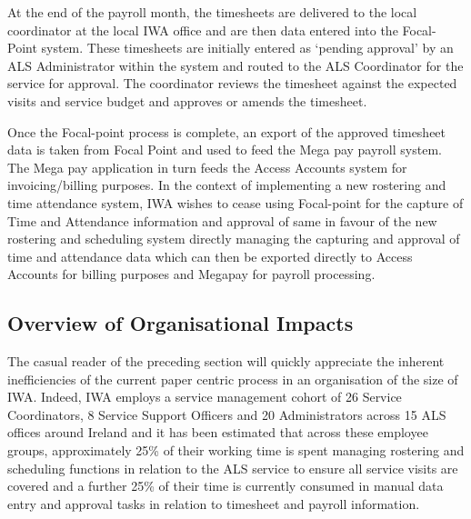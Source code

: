 \documentclass[a4paper,12pt]{article}
\begin{document}
\begin{samepage}
At the end of the payroll month, the timesheets are delivered to the local coordinator at the local IWA office and are then data entered into the Focal-Point system. These timesheets are initially entered as ‘pending approval’ by an ALS Administrator within the system and routed to the ALS Coordinator for the service for approval. The coordinator reviews the timesheet against the expected visits and service budget and approves or amends the timesheet.

Once the Focal-point process is complete, an export of the approved timesheet data is taken from Focal Point and used to feed the Mega pay payroll system. The Mega pay application in turn feeds the Access Accounts system for invoicing/billing purposes. 
In the context of implementing a new rostering and time attendance system, IWA wishes to cease using Focal-point for the capture of Time and Attendance information and approval of same in favour of the new rostering and scheduling system directly managing the capturing and approval of time and attendance data which can then be exported directly to Access Accounts for billing purposes and Megapay for payroll processing.

\subsection {Overview of Organisational  Impacts}
The casual reader of the preceding section will quickly appreciate the inherent inefficiencies of the current paper centric process in an organisation of the size of IWA. Indeed, IWA employs a service management cohort of 26 Service Coordinators, 8 Service Support Officers and 20 Administrators across 15 ALS offices around Ireland and it has been estimated that across these employee groups, approximately 25\% of their working time is spent managing rostering and scheduling functions in relation to the ALS service to ensure all service visits are covered and a further 25\% of their time is currently consumed in manual data entry and approval tasks in relation to timesheet and payroll information. 


\end{samepage}
\end{document}
